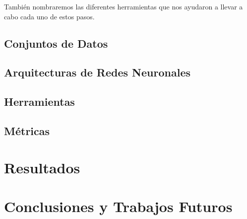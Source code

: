 \documentclass[a4paper,12pt,spanish]{book}
\begin{document}
También nombraremos las diferentes herramientas que nos ayudaron a llevar a cabo
cada uno de estos pasos.

\section{Conjuntos de Datos}


\section{Arquitecturas de Redes Neuronales}


\section{Herramientas}


\section{Métricas}



\chapter{Resultados}


\chapter{Conclusiones y Trabajos Futuros}

\newpage
\footnotesize
% 
% 
\printbibliography

\newpage
\newpage
\vfill
\addtocounter{page}{-1}
\clearpage
\thispagestyle{empty}
\phantom{a}
\vfill
\newpage
\vfill
\addtocounter{page}{-1}
\end{document}
